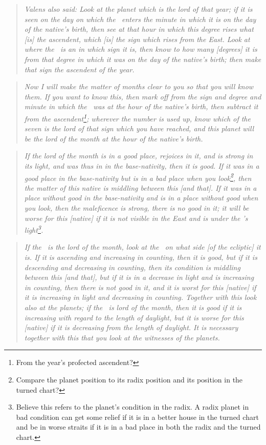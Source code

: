 \begin{quote}
\textsl{
Valens also said: Look at the planet which is the lord of that year; if it is seen on the day on which the \Sun\, enters the minute in which it is on the day of the native's birth, then see at that hour in which this degree rises what [is] the ascendent, which [is] the sign which rises from the East. Look at where the \Moon\, is an in which sign it is, then know to how many [degrees] it is from that degree in which it was on the day of the native's birth; then make that sign the ascendent of the year.
}
\end{quote}
\begin{quote}
\textsl{
Now I will make the matter of months clear to you so that you will know them. If you want to know this, then mark off from the sign and degree and minute in which the \Moon\, was at the hour of the native's birth, then subtract it from the ascendent\footnote{From the year's profected ascendent?}; wherever the number is used up, know which of the seven is the lord of that sign which you have reached, and this planet will be the lord of the month at the hour of the native's birth.}
\end{quote}
\begin{quote}
\textsl{
If the lord of the month is in a good place, rejoices in it, and is strong in its light, and was thus in in the base-nativity, then it is good. If it was in a good place in the base-nativity but is in a bad place when you look\footnote{Compare the planet position to its radix position and its position in the turned chart?}, then the matter of this native is middling between this [and that]. If it was in a place without good in the base-nativity and is in a place without good when you look, then the maleficence is strong, there is no good in it; it will be worse for this [native] if it is not visible in the East and is under the \Sun's light\footnote{Believe this refers to the planet's condition in the radix. A radix planet in bad condition can get some relief if it is in a better house in the turned chart and be in worse straits if it is in a bad place in both the radix and the turned chart.}.}
\end{quote}
\begin{quote}
\textsl{
If the \Moon\, is the lord of the month, look at the \Moon\, on what side [of the ecliptic] it is. If it is ascending and increasing in counting, then it is good, but if it is descending and decreasing in counting, then its condition is middling between this [and that], but if it is in a decrease in light and is increasing in counting, then there is not good in it, and it is worst for this [native] if it is increasing in light and decreasing in counting. Together with this look also at the planets; if the \Sun\, is lord of the month, then it is good if it is increasing with regard to the length of daylight, but it is worse for this [native] if it is decreasing from the length of daylight. It is necessary together with this that you look at the witnesses of the planets.}
\end{quote}
